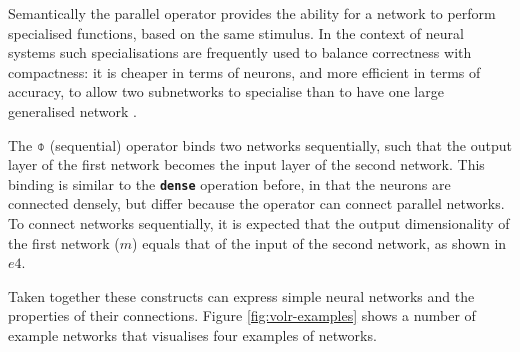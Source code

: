 Semantically the parallel operator provides the ability for a network to
perform specialised functions, based on the same stimulus.
In the context of neural systems such specialisations are frequently used
to balance correctness with compactness: it is cheaper in terms of neurons,
and more efficient in terms of accuracy,
to allow two subnetworks to specialise than to have one large
generalised network \cite{Eliasmith2015}.

The $\obar$ (sequential) operator binds two networks sequentially,
such that the output layer of the first network becomes the input layer 
of the second network.
This binding is similar to the \texttt{\textbf{dense}} operation before,
in that the neurons are connected densely, but differ because the operator
can connect parallel networks.
To connect networks sequentially, it is expected that the output dimensionality of
the first network ($m$) equals that of the input of the second network, as shown in $e4$.

Taken together these constructs can express simple neural networks and
the properties of their connections. 
Figure \ref{fig:volr-examples} shows a number of example networks
that visualises four examples of networks. 



\FloatBarrier
